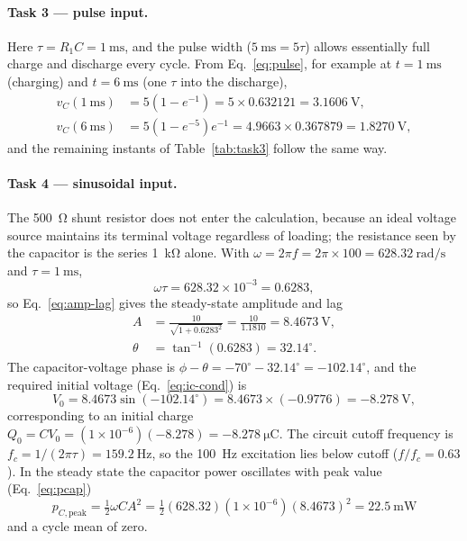 \documentclass[12pt,a4paper]{article}
\begin{document}
	\paragraph{Task 3 --- pulse input.}
	Here $\tau = R_1 C = \SI{1}{\milli\second}$, and the pulse width
	($\SI{5}{\milli\second} = 5\tau$) allows essentially full charge and
	discharge every cycle.  From Eq.~\eqref{eq:pulse}, for example at
	$t = \SI{1}{\milli\second}$ (charging) and $t = \SI{6}{\milli\second}$
	(one $\tau$ into the discharge),
	\begin{align}
		v_C(\SI{1}{\milli\second}) &= 5\left(1 - e^{-1}\right)
		= 5 \times 0.632121 = \SI{3.1606}{\volt}, \\
		v_C(\SI{6}{\milli\second}) &= 5\left(1 - e^{-5}\right)e^{-1}
		= 4.9663 \times 0.367879 = \SI{1.8270}{\volt},
	\end{align}
	and the remaining instants of Table~\ref{tab:task3} follow the same
	way.
	
	\paragraph{Task 4 --- sinusoidal input.}
	The \SI{500}{\ohm} shunt resistor does not enter the calculation,
	because an ideal voltage source maintains its terminal voltage
	regardless of loading; the resistance seen by the capacitor is the
	series \SI{1}{\kilo\ohm} alone.  With $\omega = 2\pi f = 2\pi \times
	100 = \SI{628.32}{\radian\per\second}$ and
	$\tau = \SI{1}{\milli\second}$,
	\begin{equation}
		\omega\tau = 628.32 \times 10^{-3} = 0.6283,
	\end{equation}
	so Eq.~\eqref{eq:amp-lag} gives the steady-state amplitude and lag
	\begin{align}
		A &= \frac{10}{\sqrt{1 + 0.6283^2}}
		= \frac{10}{1.1810} = \SI{8.4673}{\volt},\\
		\theta &= \tan^{-1}(0.6283) = 32.14^{\circ}.
	\end{align}
	The capacitor-voltage phase is $\phi - \theta = -70^\circ - 32.14^\circ
	= -102.14^\circ$, and the required initial voltage
	(Eq.~\eqref{eq:ic-cond}) is
	\begin{equation}
		V_0 = 8.4673\sin(-102.14^{\circ})
		= 8.4673 \times (-0.9776) = \SI{-8.278}{\volt},
	\end{equation}
	corresponding to an initial charge
	$Q_0 = C V_0 = (1\times10^{-6})(-8.278) =
	\SI{-8.278}{\micro\coulomb}$.  The circuit cutoff frequency is
	$f_c = 1/(2\pi\tau) = \SI{159.2}{\hertz}$, so the
	\SI{100}{\hertz} excitation lies below cutoff
	($f/f_c = 0.63$).  In the steady state the capacitor power
	oscillates with peak value (Eq.~\eqref{eq:pcap})
	\begin{equation}
		p_{C,\mathrm{peak}} = \tfrac{1}{2}\omega C A^{2}
		= \tfrac{1}{2}(628.32)\left(1\times10^{-6}\right)(8.4673)^2
		= \SI{22.5}{\milli\watt}
	\end{equation}
	and a cycle mean of zero.
	
\end{document}
